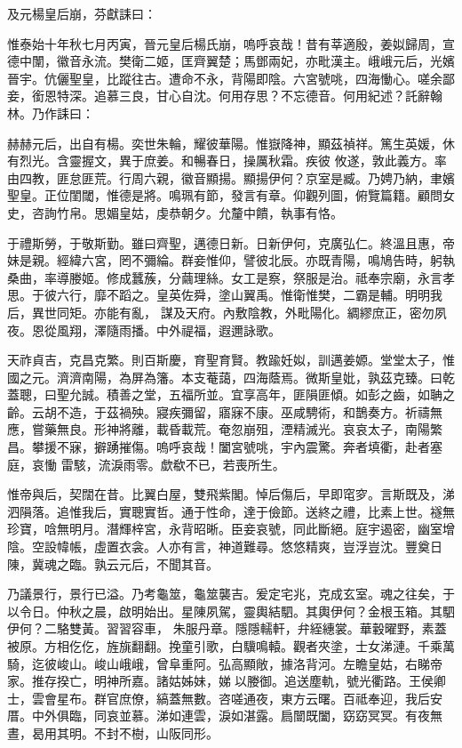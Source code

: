 \begin{pinyinscope}
 及元楊皇后崩，芬獻誄曰：



 惟泰始十年秋七月丙寅，晉元皇后楊氏崩，嗚呼哀哉！昔有莘適殷，姜姒歸周，宣德中闈，徽音永流。樊衛二姬，匡齊翼楚；馬鄧兩妃，亦毗漢主。峨峨元后，光嬪晉宇。伉儷聖皇，比蹤往古。遭命不永，背陽即陰。六宮號咷，四海慟心。嗟余鄙妾，銜恩特深。追慕三良，甘心自沈。何用存思？不忘德音。何用紀述？託辭翰林。乃作誄曰：



 赫赫元后，出自有楊。奕世朱輪，耀彼華陽。惟嶽降神，顯茲禎祥。篤生英媛，休有烈光。含靈握文，異于庶姜。和暢春日，操厲秋霜。疾彼
 攸遂，敦此義方。率由四教，匪怠匪荒。行周六親，徽音顯揚。顯揚伊何？京室是臧。乃娉乃納，聿嬪聖皇。正位閨閾，惟德是將。鳴珮有節，發言有章。仰觀列圖，俯覽篇籍。顧問女史，咨詢竹帛。思媚皇姑，虔恭朝夕。允釐中饋，執事有恪。



 于禮斯勞，于敬斯勤。雖曰齊聖，邁德日新。日新伊何，克廣弘仁。終溫且惠，帝妹是親。經緯六宮，罔不彌綸。群妾惟仰，譬彼北辰。亦既青陽，鳴鳩告時，躬執桑曲，率導媵姬。修成蠶蔟，分繭理絲。女工是察，祭服是治。祗奉宗廟，永言孝思。于彼六行，靡不蹈之。皇英佐舜，塗山翼禹。惟衛惟樊，二霸是輔。明明我后，異世同矩。亦能有亂，
 謀及天府。內敷陰教，外毗陽化。綢繆庶正，密勿夙夜。恩從風翔，澤隨雨播。中外禔福，遐邇詠歌。



 天祚貞吉，克昌克繁。則百斯慶，育聖育賢。教踰妊姒，訓邁姜嫄。堂堂太子，惟國之元。濟濟南陽，為屏為籓。本支菴藹，四海蔭焉。微斯皇妣，孰茲克臻。曰乾蓋聰，曰聖允誠。積善之堂，五福所並。宜享高年，匪隕匪傾。如彭之齒，如聃之齡。云胡不造，于茲禍殃。寢疾彌留，寤寐不康。巫咸騁術，和鵲奏方。祈禱無應，嘗藥無良。形神將離，載昏載荒。奄忽崩殂，湮精滅光。哀哀太子，南陽繁昌。攀援不寐，擗踴摧傷。嗚呼哀哉！闔宮號咷，宇內震驚。奔者填衢，赴者塞庭，哀慟
 雷駭，流淚雨零。歔欷不已，若喪所生。



 惟帝與后，契闊在昔。比翼白屋，雙飛紫閣。悼后傷后，早即窀穸。言斯既及，涕泗隕落。追惟我后，實聰實哲。通于性命，達于儉節。送終之禮，比素上世。襚無珍寶，唅無明月。潛輝梓宮，永背昭晰。臣妾哀號，同此斷絕。庭宇遏密，幽室增陰。空設幃帳，虛置衣衾。人亦有言，神道難尋。悠悠精爽，豈浮豈沈。豐奠日陳，冀魂之臨。孰云元后，不聞其音。



 乃議景行，景行已溢。乃考龜筮，龜筮襲吉。爰定宅兆，克成玄室。魂之往矣，于以令日。仲秋之晨，啟明始出。星陳夙駕，靈輿結駟。其輿伊何？金根玉箱。其駟伊何？二駱雙黃。習習容車，
 朱服丹章。隱隱轜軒，弁絰繐裳。華轂曜野，素蓋被原。方相仡仡，旌旐翻翻。挽童引歌，白驥鳴轅。觀者夾塗，士女涕漣。千乘萬騎，迄彼峻山。峻山峨峨，曾阜重阿。弘高顯敞，據洛背河。左瞻皇姑，右睇帝家。推存揆亡，明神所嘉。諸姑姊妹，娣以媵御。追送塵軌，號光衢路。王侯卿士，雲會星布。群官庶僚，縞蓋無數。咨嗟通夜，東方云曙。百祗奉迎，我后安厝。中外俱臨，同哀並慕。涕如連雲，淚如湛露。扃闓既闔，窈窈冥冥。有夜無晝，曷用其明。不封不樹，山阪同形。




\end{pinyinscope}
